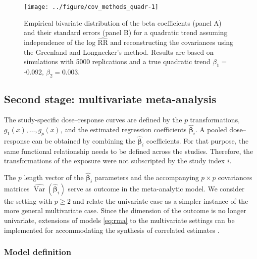 \documentclass[11pt,a4paper,twoside,openany]{book}\usepackage{knitr}
\DeclareMathOperator{\Var}{Var}
\begin{document}
{\begin{knitrout}
\end{knitrout}

\begin{knitrout}\footnotesize
{}\color{fgcolor}\begin{figure}[ht!]

{\centering \texttt{[image: ../figure/cov\_methods\_quadr-1]} 

}

\caption{Empirical bivariate distribution of the beta coefficients (panel A) and their standard errors (panel B) for a quadratic trend assuming independence of the log $\widehat{\mathrm{RR}}$  and reconstructing the covariances using the Greenland and Longnecker’s method. Results are based on simulations with 5000 replications and a true quadratic trend $\beta_{1} = $-0.092, $\beta_{2} = $0.003.}\label{fig:cov_methods_quadr}
\end{figure}


\end{knitrout}


\subsection{Second stage: multivariate meta-analysis}\label{sec:2nd_stage}

The study-specific dose--response curves are defined by the $p$ transformations, $g_1(x), \dots, g_p(x)$, and the estimated regression coefficients $\boldsymbol{\hat \beta}_i$. A pooled dose--response can be obtained by combining the $\boldsymbol{\hat \beta}_i$ coefficients. For that purpose, the same functional relationship needs to be defined across the studies. Therefore, the transformations of the exposure were not subscripted by the study index $i$.

\noindent The $p$ length vector of the $\boldsymbol{\hat \beta}_i$ parameters and the accompanying $p \times p$ covariances matrices $\widehat{\Var} \left( \boldsymbol{\hat \beta}_i \right)$ serve as outcome in the meta-analytic model. We consider the setting with $p \ge 2$ and relate the univariate case as a simpler instance of the more general multivariate case. Since the dimension of the outcome is no longer univariate, extensions of models \ref{eq:rma} to the multivariate settings can be implemented for accommodating the synthesis of correlated estimates \citep{berkey1998meta, gasparrini2012multivariate, ritz2008multivariate}.

\subsubsection*{Model definition}

}
\end{document}
